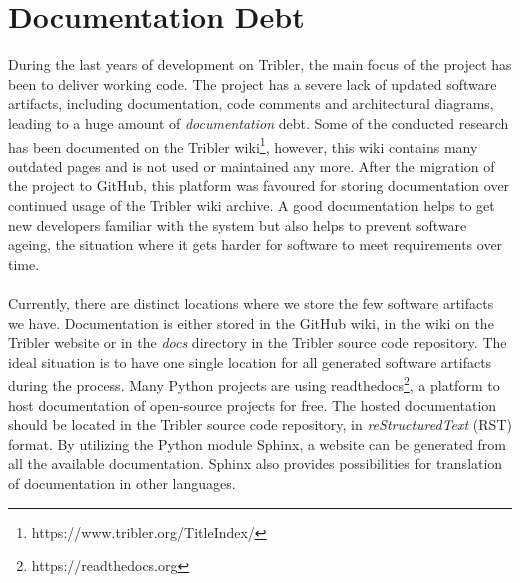 
\section{Documentation Debt}
\label{sec:software-artifacts}
During the last years of development on Tribler, the main focus of the project has been to deliver working code. The project has a severe lack of updated software artifacts, including documentation, code comments and architectural diagrams, leading to a huge amount of \emph{documentation} debt. Some of the conducted research has been documented on the Tribler wiki\footnote{https://www.tribler.org/TitleIndex/}, however, this wiki contains many outdated pages and is not used or maintained any more. After the migration of the project to GitHub, this platform was favoured for storing documentation over continued usage of the Tribler wiki archive. A good documentation helps to get new developers familiar with the system but also helps to prevent software ageing\cite{parnas1994software}, the situation where it gets harder for software to meet requirements over time.\\\\
Currently, there are distinct locations where we store the few software artifacts we have. Documentation is either stored in the GitHub wiki, in the wiki on the Tribler website or in the \emph{docs} directory in the Tribler source code repository. The ideal situation is to have one single location for all generated software artifacts during the process. Many Python projects are using readthedocs\footnote{https://readthedocs.org}, a platform to host documentation of open-source projects for free. The hosted documentation should be located in the Tribler source code repository, in \emph{reStructuredText} (RST) format. By utilizing the Python module Sphinx, a website can be generated from all the available documentation. Sphinx also provides possibilities for translation of documentation in other languages.\\

